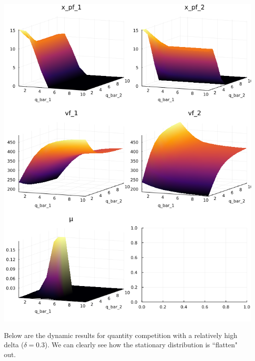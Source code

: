 \documentclass{article}
\begin{document}
\includegraphics[scale=.65]{q_low_delta_dynamic.png}

\pagebreak

Below are the dynamic results for quantity competition with a relatively high delta ($\delta = 0.3$). We can clearly see how the stationary distribution is ``flatten" out.
\end{document}
